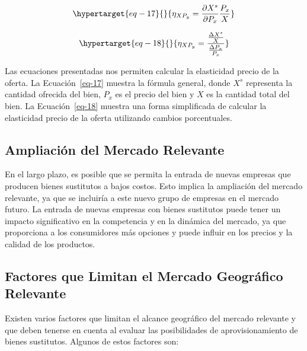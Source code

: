 \documentclass[
  letterpaper,
  DIV=11,
  numbers=noendperiod]{scrartcl}
\begin{document}
\begin{equation}\protect\hypertarget{eq-17}{}{
\eta_{XP_{y}} = \frac{\partial X^s}{\partial P_{x}} \frac{P_{x}}{X}
}\label{eq-17}\end{equation}

\begin{equation}\protect\hypertarget{eq-18}{}{
\eta_{XP_{y}} = \frac{\frac{\Delta X^s}{X}}{\frac{\Delta P_{x}}{P_{x}}}
}\label{eq-18}\end{equation}

Las ecuaciones presentadas nos permiten calcular la elasticidad precio
de la oferta. La Ecuación~\ref{eq-17} muestra la fórmula general, donde
\(X^s\) representa la cantidad ofrecida del bien, \(P_x\) es el precio
del bien y \(X\) es la cantidad total del bien. La Ecuación~\ref{eq-18}
muestra una forma simplificada de calcular la elasticidad precio de la
oferta utilizando cambios porcentuales.

\hypertarget{ampliaciuxf3n-del-mercado-relevante}{%
\subsection{Ampliación del Mercado
Relevante}\label{ampliaciuxf3n-del-mercado-relevante}}

En el largo plazo, es posible que se permita la entrada de nuevas
empresas que producen bienes sustitutos a bajos costos. Esto implica la
ampliación del mercado relevante, ya que se incluiría a este nuevo grupo
de empresas en el mercado futuro. La entrada de nuevas empresas con
bienes sustitutos puede tener un impacto significativo en la competencia
y en la dinámica del mercado, ya que proporciona a los consumidores más
opciones y puede influir en los precios y la calidad de los productos.

\hypertarget{factores-que-limitan-el-mercado-geogruxe1fico-relevante}{%
\subsection{Factores que Limitan el Mercado Geográfico
Relevante}\label{factores-que-limitan-el-mercado-geogruxe1fico-relevante}}

Existen varios factores que limitan el alcance geográfico del mercado
relevante y que deben tenerse en cuenta al evaluar las posibilidades de
aprovisionamiento de bienes sustitutos. Algunos de estos factores son:
\end{document}
